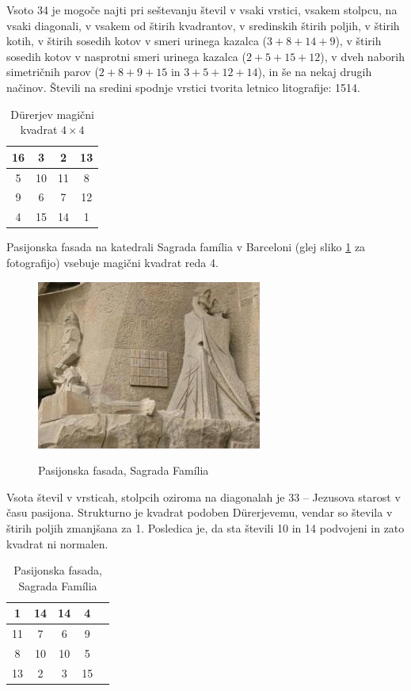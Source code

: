 \documentclass[a4paper,12pt]{article}
\begin{document}
Vsoto 34 je mogoče najti pri seštevanju števil v vsaki vrstici, vsakem stolpcu,
na vsaki diagonali, v vsakem od štirih kvadrantov, v sredinskih štirih poljih,
v štirih kotih, v štirih sosedih kotov v smeri urinega kazalca ($3+8+14+9$), v
štirih sosedih kotov v nasprotni smeri urinega kazalca ($2+5+15+12$), v dveh naborih
simetričnih parov ($2+8+9+15$ in $3+5+12+14$), in še na nekaj drugih načinov.
Števili na sredini spodnje vrstici tvorita letnico litografije: 1514.


\begin{table}
   \centering
   \label{table:durer}
   \caption{Dürerjev magični kvadrat $4\times 4$}
   \begin{tabular}{|c|c|c|c|}
      \hline
	   16 &  3 &  2 & 13 \\\hline
    5 & 10 & 11 &  8 \\\hline
    9 &  6 &  7 & 12 \\\hline
    4 & 15 & 14 &  1 \\\hline
\end{tabular}
\end{table}
Pasijonska fasada na katedrali Sagrada família v Barceloni
(glej sliko \ref{fig:sagrada} za fotografijo) vsebuje magični kvadrat reda 4.


\begin{figure}[!ht]
   \centering
   \caption{Pasijonska fasada, Sagrada Família}
	\includegraphics{sagrada.png}
   \label{fig:sagrada}
\end{figure}

Vsota števil v vrsticah, stolpcih oziroma na diagonalah je 33 -- Jezusova starost
v času pasijona. Strukturno je kvadrat podoben Dürerjevemu, vendar so števila
v štirih poljih zmanjšana za 1. Posledica je, da sta števili 10 in 14 podvojeni
in zato kvadrat ni normalen.

\begin{table}
   \centering
   \caption{Pasijonska fasada, Sagrada Família}
   \label{table:sagrada}
   \begin{tabular}{|c|c|c|c|c|}
      \hline
	    1 & 14 & 14 &  4 \\\hline
   11 &  7 &  6 &  9 \\\hline
    8 & 10 & 10 &  5 \\\hline
   13 &  2 &  3 & 15 \\\hline
\end{tabular}
\end{table}
\end{document}

